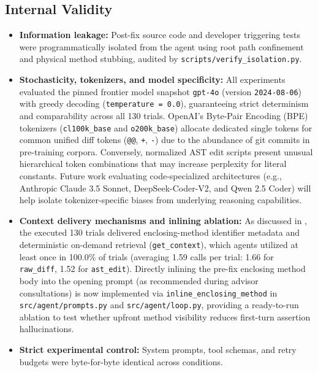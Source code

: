 \documentclass[12pt, a4paper]{article}
\begin{document}
\subsection{Internal Validity}\label{sec:internal_validity}
\begin{itemize}[leftmargin=*]
  \item \textbf{Information leakage:} Post-fix source code and developer triggering tests were programmatically isolated from the agent using root path confinement and physical method stubbing, audited by \texttt{scripts/verify\_isolation.py}.
  \item \textbf{Stochasticity, tokenizers, and model specificity:} All experiments evaluated the pinned frontier model snapshot \texttt{gpt-4o} (version \texttt{2024-08-06}) with greedy decoding (\texttt{temperature = 0.0}), guaranteeing strict determinism and comparability across all 130 trials.
    OpenAI's Byte-Pair Encoding (BPE) tokenizers (\texttt{cl100k\_base} and \texttt{o200k\_base}) allocate dedicated single tokens for common unified diff tokens (\texttt{@@}, \texttt{+}, \texttt{-}) due to the abundance of git commits in pre-training corpora.
    Conversely, normalized AST edit scripts present unusual hierarchical token combinations that may increase perplexity for literal constants.
    Future work evaluating code-specialized architectures (e.g., Anthropic Claude 3.5 Sonnet, DeepSeek-Coder-V2, and Qwen 2.5 Coder) will help isolate tokenizer-specific biases from underlying reasoning capabilities.
  \item \textbf{Context delivery mechanisms and inlining ablation:} As discussed in , the executed 130 trials delivered enclosing-method identifier metadata and deterministic on-demand retrieval (\texttt{get\_context}), which agents utilized at least once in 100.0\% of trials (averaging 1.59 calls per trial: 1.66 for \texttt{raw\_diff}, 1.52 for \texttt{ast\_edit}).
    Directly inlining the pre-fix enclosing method body into the opening prompt (as recommended during advisor consultations) is now implemented via \texttt{inline\_enclosing\_method} in \texttt{src/agent/prompts.py} and \texttt{src/agent/loop.py}, providing a ready-to-run ablation to test whether upfront method visibility reduces first-turn assertion hallucinations.
  \item \textbf{Strict experimental control:} System prompts, tool schemas, and retry budgets were byte-for-byte identical across conditions.

\end{itemize}
\end{document}
